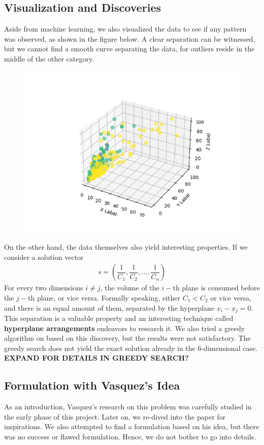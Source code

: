 \documentclass[12pt,letterpaper]{article}
\begin{document}
\subsection{Visualization and Discoveries}
Aside from machine learning, we also visualized the data to see if any pattern was observed, as shown in the figure below. 
A clear separation can be witnessed, but we cannot find a smooth curve separating the data, for outliers reside 
in the middle of the other category. 
\begin{figure}[ht]
    \centering
    \includegraphics[scale=0.6]{3d_plot.png}
\end{figure}
On the other hand, the data themselves also yield interesting properties. If we consider a solution vector 
\begin{align*}
 s = \left( \dfrac{1}{C_1}, \dfrac{1}{C_2}, ..., \dfrac{1}{C_n} \right)
\end{align*}
For every two dimensions $ i \neq j$, the volume of the $i-$th plane is consumed before the $j-$th plane, or vice versa.
Formally speaking, either $C_1 < C_2$ or vice versa, and there is an equal amount of them, separated by the hyperplane 
$x_i - x_j = 0$. This separation is a valuable property and an interesting technique called \textbf{hyperplane arrangements} 
endeavors to research it. We also tried a greedy algorithm on based on this discovery, but the results 
were not satisfactory. The greedy search does not yield the exact solution already in the 6-dimensional case.
\textbf{EXPAND FOR DETAILS IN GREEDY SEARCH?}

\subsection{Formulation with Vasquez's Idea}
As an introduction, Vasquez's research \cite{vasquez2015airplane} on this problem was carefully studied 
in the early phase of this project. Later on, we re-dived into the paper for inspirations.
We also attempted to find a formulation based on his idea, but there was no success or flawed formulation. 
Hence, we do not bother to go into details. 
\end{document}
